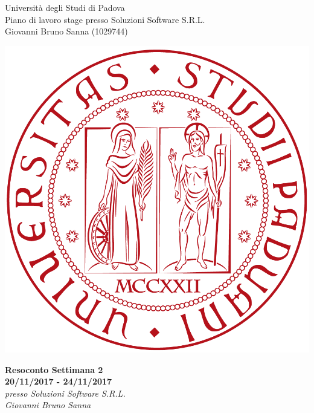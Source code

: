 \documentclass[11pt,notitlepage]{article}
\makeatletter
\newcommand{\nomeStudente}{Giovanni Bruno}
\newcommand{\cognomeStudente}{Sanna}
\newcommand{\matricolaStudente}{1029744}
\newcommand{\emailStudente}{giovannibruno.sanna@studenti.unipd.com}
\newcommand{\telStudente}{+39 0000000000}
\newcommand{\nomeTutorAziendale}{Nome}
\newcommand{\cognomeTutorAziendale}{Cognome}
\newcommand{\emailTutorAziendale}{xxtutor@azienda.it}
\newcommand{\telTutorAziendale}{+39 0000000000}
\newcommand{\ragioneSocAzienda}{Soluzioni Software S.R.L.}
\newcommand{\indirizzoAzienda}{Via Via dei Ronchi, 21, 35127 Padova (PD)}
\newcommand{\sitoAzienda}{http://www.soluzioni-sw.it/}
\makeatother
\begin{document}
	
\noindent
\parbox{0.7\columnwidth}{Università degli Studi di Padova\\
	Piano di lavoro stage presso \ragioneSocAzienda{}\\
	\nomeStudente{} \cognomeStudente{} (\matricolaStudente{})}%
\parbox{0.3\columnwidth}{
	\hfill \includegraphics[scale=0.08]{immagini/logo-unipd.png}}

\bigskip
\begin{center}
{\Huge \textbf{Resoconto Settimana 2}} \\ 
{\textbf{20/11/2017 - 24/11/2017}} \\ \bigskip
	{\Large \textit{presso \ragioneSocAzienda{}}}\\ \bigskip
	{\Large \textit{\nomeStudente{} \cognomeStudente{}}}
\end{center}

\end{document}
